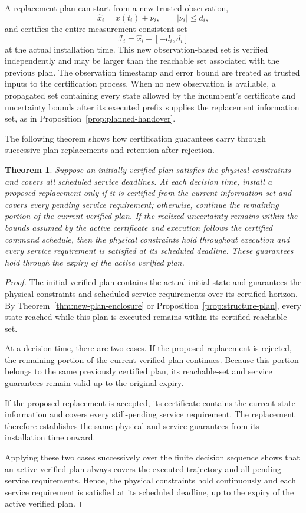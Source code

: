\documentclass[journal,10pt]{IEEEtran}
\newtheorem{theorem}{Theorem}
\begin{document}
A replacement plan can start from a new trusted observation,
\[
\widehat x_i=x(t_i)+\nu_i,\qquad |\nu_i|\le d_i,
\]
and certifies the entire measurement-consistent set
\[
\mathcal I_i=\widehat x_i+[-d_i,d_i]
\]
at the actual installation time. This new observation-based set is verified
independently and may be larger than the reachable set associated with the
previous plan. The observation timestamp and error bound are treated as
trusted inputs to the certification process. When no new observation is
available, a propagated set containing every state allowed by the
incumbent's certificate and uncertainty bounds after its executed prefix
supplies the replacement information set, as in
Proposition~\ref{prop:planned-handover}.

The following theorem shows how certification guarantees carry through successive plan replacements and retention after rejection.

\begin{theorem}
\label{thm:new-plan-closure}
Suppose an initially verified plan satisfies the physical constraints and
covers all scheduled service deadlines. At each decision time, install a
proposed replacement only if it is certified from the current information set
and covers every pending service requirement; otherwise, continue the
remaining portion of the current verified plan. If the realized uncertainty
remains within the bounds assumed by the active certificate and execution
follows the certified command schedule, then the physical constraints hold
throughout execution and every service requirement is satisfied at its
scheduled deadline. These guarantees hold through the expiry of the active
verified plan.
\end{theorem}

\begin{proof}
The initial verified plan contains the actual initial state and guarantees the
physical constraints and scheduled service requirements over its certified
horizon. By Theorem~\ref{thm:new-plan-enclosure} or
Proposition~\ref{prop:structure-plan}, every state reached while this plan is
executed remains within its certified reachable set.

At a decision time, there are two cases. If the proposed replacement is
rejected, the remaining portion of the current verified plan continues.
Because this portion belongs to the same previously certified plan, its
reachable-set and service guarantees remain valid up to the original expiry.

If the proposed replacement is accepted, its certificate contains the current
state information and covers every still-pending service requirement. The
replacement therefore establishes the same physical and service guarantees
from its installation time onward.

Applying these two cases successively over the finite decision sequence shows
that an active verified plan always covers the executed trajectory and all
pending service requirements. Hence, the physical constraints hold
continuously and each service requirement is satisfied at its scheduled
deadline, up to the expiry of the active verified plan.
\end{proof}
\end{document}
